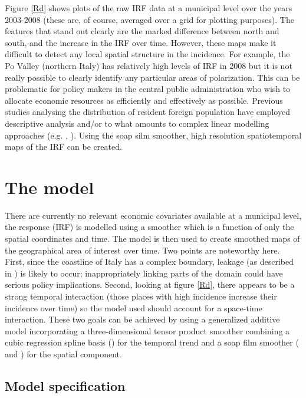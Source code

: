 Figure \ref{Rd} shows plots of the raw IRF data at a municipal level over the years 2003-2008 (these are, of course, averaged over a grid for plotting purposes). The features that stand out clearly are the marked difference between north and south, and the increase in the IRF over time. However, these maps make it difficult to detect any local spatial structure in the incidence. For example, the Po Valley (northern Italy) has relatively high levels of IRF in 2008 but it is not really possible to clearly identify any particular areas of polarization. This can be problematic for policy makers in the central public administration who wish to allocate economic resources as efficiently and effectively as possible. Previous studies analysing the distribution of resident foreign population have employed descriptive analysis and/or to what amounts  to complex linear modelling approaches (e.g. \cite{Fonseca2008}, \cite{Longhi2010}). Using the soap silm smoother, high resolution spatiotemporal maps of the IRF can be created.


\section{The model \label{METH}}

There are currently no relevant economic covariates available at a municipal level, the response (IRF) is modelled using a smoother which is a function of only the spatial coordinates and time. The model is then used to create smoothed maps of the geographical area of interest over time. Two points are noteworthy here. First, since the coastline of Italy has a complex boundary, leakage (as described in ) is likely to occur; inappropriately linking parts of the domain could have serious policy implications. Second, looking at figure \ref{Rd}, there appears to be a strong temporal interaction (those places with high incidence increase their incidence over time) so the model used should account for a space-time interaction. These two goals can be achieved by using a generalized additive model incorporating a three-dimensional tensor product smoother combining a cubic regression spline basis () for the temporal trend and a soap film smoother (\cite{soap} and ) for the spatial component.

\subsection{Model specification \label{MS}}

